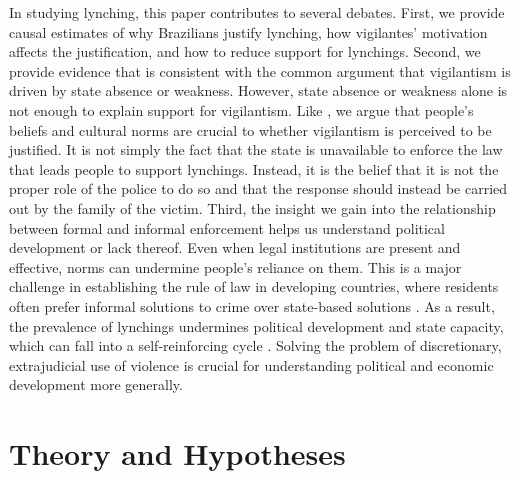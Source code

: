 \documentclass[12pt,ansiapaper]{article}
\begin{document}
In studying lynching, this  paper contributes to several debates. First, we provide causal estimates of why Brazilians justify lynching, how vigilantes' motivation affects the justification, and how to reduce support for lynchings. Second, we provide evidence that is consistent with the common argument that vigilantism is driven by state absence or weakness. However, state absence or weakness alone is not enough to explain support for vigilantism. Like \cite{jung2020lynching}, we argue that people's beliefs and cultural norms are crucial to whether vigilantism is perceived to be justified. It is not simply the fact that the state is unavailable to enforce the law that leads people to support lynchings. Instead, it is the belief that it is not the proper role of the police to do so and that the response should instead be carried out by the family of the victim. Third, the insight we gain into the relationship between formal and informal enforcement helps us understand political development or lack thereof. Even when legal institutions are present and effective, norms  can undermine people's reliance on them. This is a major challenge in establishing the rule of law in developing countries, where residents often prefer informal solutions to crime over state-based solutions \citep[10]{blair2020peacekeeping}. As a result, the prevalence of lynchings undermines political development and state capacity, which can fall into a self-reinforcing cycle \citep{jung2020lynching}. Solving the problem of discretionary, extrajudicial use of violence is crucial for understanding political and economic development more generally. 

\section{Theory and Hypotheses}
\label{sec:theory}
\end{document}
